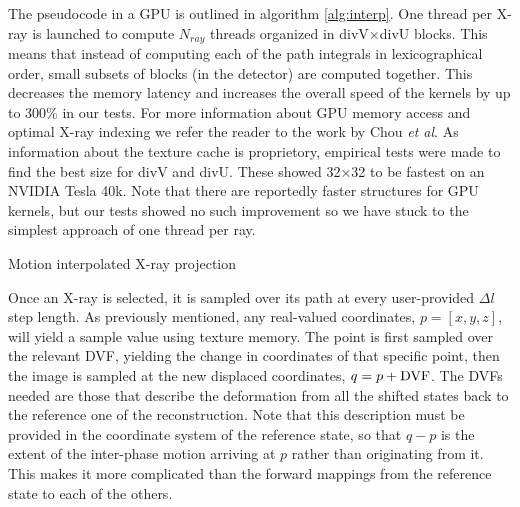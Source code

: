 The pseudocode in a GPU is outlined in algorithm \ref{alg:interp}.  One thread per X-ray is launched to compute $N_{ray}$ threads organized in divV$\times$divU blocks.  This means that instead of computing each of the path integrals in lexicographical order, small subsets of blocks (in the detector) are computed together.  This decreases the memory latency and increases the overall speed of the kernels by up to 300\% in our tests.  For more information about GPU memory access and optimal X-ray indexing we refer the reader to the work by Chou \emph{et al}\cite{Chou2011}.  As information about the texture cache is proprietory, empirical tests were made to find the best size for divV and divU.  These showed 32$\times$32 to be fastest on an NVIDIA Tesla 40k.  Note that there are reportedly faster structures for GPU kernels\cite{forwardproj}, but our tests showed no such improvement so we have stuck to the simplest approach of one thread per ray.

\begin{algorithm}

\caption{Motion interpolated X-ray projection
\label{alg:interp}}
\begin{algorithmic}[1]
    
\EndFor
\Ensure{} 
\end{algorithmic}

\end{algorithm}

Once an X-ray is selected, it is sampled over its path at every user-provided $\Delta l$ step length.  As previously mentioned, any real-valued coordinates, $p=[x,y,z]$, will yield a sample value using texture memory.  The point is first sampled over the relevant DVF, yielding the change in coordinates of that specific point, then the image is sampled at the new displaced coordinates, $q=p+\textup{DVF}$.  The DVFs needed are those that describe the deformation from all the shifted states back to the reference one of the reconstruction.   Note that this description must be provided in the coordinate system of the reference state, so that $q-p$ is the extent of the inter-phase motion arriving at $p$ rather than originating from it.  This makes it more complicated than the forward mappings from the reference state to each of the others.



